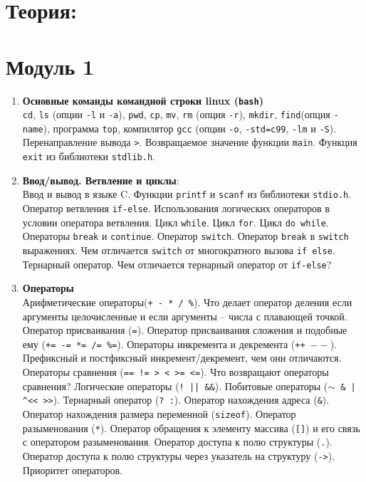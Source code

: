 \documentclass{article}
\begin{document}

\section*{Теория:}

\section*{Модуль 1}
\begin{enumerate}
\item \textbf{Основные команды командной строки linux (\texttt{bash})}\\
 \texttt{cd}, \texttt{ls} (опции \texttt{-l} и \texttt{-a}), \texttt{pwd}, \texttt{cp}, \texttt{mv}, \texttt{rm} (опция \texttt{-r}), \texttt{mkdir}, \texttt{find}(опция \texttt{-name}), программа \texttt{top}, компилятор \texttt{gcc} (опции \texttt{-o}, \texttt{-std=c99}, \texttt{-lm} и \texttt{-S}). Перенаправление вывода \texttt{>}. Возвращаемое значение функции \texttt{main}. Функция \texttt{exit} из библиотеки \texttt{stdlib.h}.

\item \textbf{Ввод/вывод. Ветвление и циклы}:\\
 Ввод и вывод в языке C. Функции \texttt{printf} и \texttt{scanf} из библиотеки \texttt{stdio.h}.
Оператор ветвления \texttt{if-else}. Использования логических операторов в условии оператора ветвления.  Цикл \texttt{while}. Цикл \texttt{for}. Цикл \texttt{do while}. Операторы \texttt{break} и \texttt{continue}. Оператор \texttt{switch}. Оператор \texttt{break} в \texttt{switch} выражениях. Чем отличается \texttt{switch} от многократного вызова \texttt{if else}. Тернарный оператор. Чем отличается тернарный оператор от \texttt{if-else}?

\item \textbf{Операторы}\\
Арифметические операторы(\texttt{+ - * / \%}). Что делает оператор деления если аргументы целочисленные и если аргументы -- числа с плавающей точкой. Оператор присваивания (\texttt{=}). Оператор присваивания сложения и подобные ему (\texttt{+= -= *= /= \%=}). Операторы инкремента и декремента (\texttt{++  $--$}). Префиксный  и постфиксный инкремент/декремент, чем они отличаются. Операторы сравнения (\texttt{== != > < >= <=}). Что возвращают операторы сравнения? Логические операторы (\texttt{!  ||  \&\&}). Побитовые операторы (\texttt{$\sim$  \&  |  \textasciicircum \quad <{}<  >{}>}). Тернарный оператор (\texttt{? :}). Оператор нахождения адреса (\texttt{\&}). Оператор нахождения размера переменной (\texttt{sizeof}). Оператор разыменования (\texttt{*}). Оператор обращения к элементу массива (\texttt{[]}) и его связь с оператором разыменования. Оператор доступа к полю структуры (\texttt{.}). Оператор доступа к полю структуры через указатель на структуру (\texttt{->}). Приоритет операторов. 



\end{enumerate}
\end{document}

